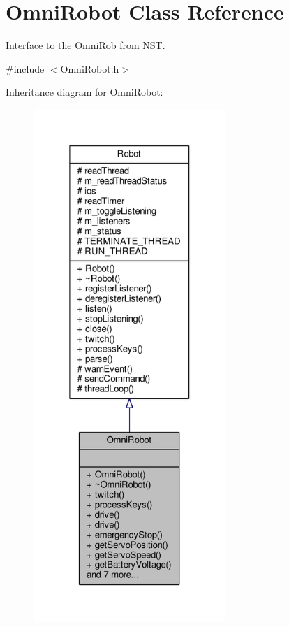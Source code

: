 \hypertarget{class_omni_robot}{}\section{Omni\+Robot Class Reference}
\label{class_omni_robot}


Interface to the Omni\+Rob from N\+S\+T.  




{\ttfamily \#include $<$Omni\+Robot.\+h$>$}



Inheritance diagram for Omni\+Robot\+:
\nopagebreak
\begin{figure}[H]
\begin{center}
\leavevmode
\includegraphics[height=550pt]{class_omni_robot__inherit__graph}
\end{center}
\end{figure}


